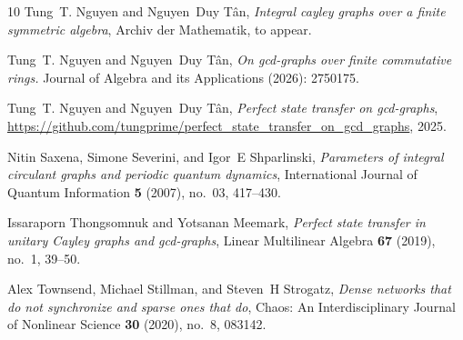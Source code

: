 \documentclass[12pt, a4paper]{amsart}
\theoremstyle{definition}
\numberwithin{equation}{section}
\begin{document}
\begin{thebibliography}{10}
Tung~T. Nguyen and Nguyen~Duy T{\^a}n, \emph{Integral cayley graphs over a finite symmetric algebra}, Archiv der Mathematik, to appear.

Tung~T. Nguyen and Nguyen~Duy T{\^a}n, \emph{On gcd-graphs over finite commutative rings.} Journal of Algebra and its Applications (2026): 2750175.

Tung~T. Nguyen and Nguyen~Duy T{\^a}n, \emph{Perfect state transfer on gcd-graphs}, \url{https://github.com/tungprime/perfect_state_transfer_on_gcd_graphs}, 2025.

Nitin Saxena, Simone Severini, and Igor~E Shparlinski, \emph{Parameters of integral circulant graphs and periodic quantum dynamics}, International Journal of Quantum Information \textbf{5} (2007), no.~03, 417--430.

Issaraporn Thongsomnuk and Yotsanan Meemark, \emph{Perfect state transfer in unitary {C}ayley graphs and gcd-graphs}, Linear Multilinear Algebra \textbf{67} (2019), no.~1, 39--50. 

Alex Townsend, Michael Stillman, and Steven~H Strogatz, \emph{Dense networks that do not synchronize and sparse ones that do}, Chaos: An Interdisciplinary Journal of Nonlinear Science \textbf{30} (2020), no.~8, 083142.

\end{thebibliography}
\end{document}
